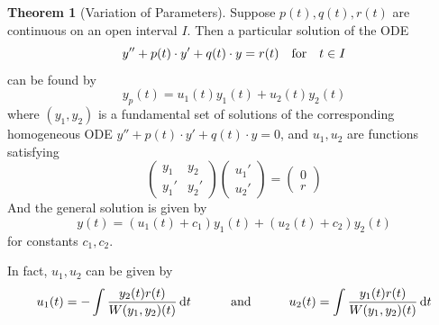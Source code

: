 \documentclass[10pt,UTF8]{article}
\newenvironment{theoremBox}
{
  \begin{tcolorbox}[colback=yellow!5!white,colframe=yellow!75!black,parbox=false,before
  upper=\par,before lower=\par]}
  {
\end{tcolorbox}}
\theoremstyle{definition}
\newtheorem{definition inner}{Definition}[section]
\theoremstyle{definition}
\newtheorem{theorem inner}{Theorem}[section]
\newenvironment{theorem}[1][]
{
  \begin{theoremBox}
  \begin{theorem inner}[#1]\hfill\par}
    {
    \end{theorem inner}
\end{theoremBox}}
\theoremstyle{definition}
\newtheorem*{proof inner}{\textit{Proof}}
\theoremstyle{plain}
\newtheorem{tip inner}{Tip}[section]
\theoremstyle{remark}
\begin{document}
\begin{theorem}[Variation of Parameters]
  {}\label{thm: Variation of Parameters}
  Suppose \(p(t), q(t), r(t)\) are continuous on an open interval \(I\).
  Then a particular solution of the ODE
  \begin{equation}
    y'' + p(t)\cdot y' + q(t)\cdot y = r(t)
    \qfor t \in I
    \label{eq: local.07 non-homogeneous CC ODE}
  \end{equation}
  can be found by
  \begin{equation}
    y_p(t) = u_1(t) y_1(t) + u_2(t) y_2(t)
    \label{eq: local.08 a particular solution}
  \end{equation}
  where \((y_1, y_2)\) is a fundamental set of solutions of the
  corresponding homogeneous ODE \(y'' + p(t)\cdot y' + q(t)\cdot y = 0\),
  and \(u_1, u_2\) are functions satisfying
  \begin{equation}
    \begin{pmatrix}
      y_1 & y_2 \\ y_1' & y_2'
    \end{pmatrix}
    \begin{pmatrix}
      u_1' \\ u_2'
    \end{pmatrix} =
    \begin{pmatrix}
      0 \\ r
    \end{pmatrix}
    \label{eq: local.09 conditions for u_1 and u_2}
  \end{equation}
  And the general solution is given by
  \begin{equation}
    y(t) = (u_1(t) + c_1) y_1(t) + (u_2(t) + c_2) y_2(t)
    \label{eq: local.11 the general solution}
  \end{equation}
  for constants \(c_1, c_2\).
\end{theorem}

In fact, \(u_1, u_2\) can be given by
\begin{equation}
  u_1(t) = - \int \frac{y_2(t) r(t)}{W(y_1,y_2)(t)} \dd{t}
  \qquad\qand\qquad
  u_2(t) = \int \frac{y_1(t) r(t)}{W(y_1,y_2)(t)} \dd{t}
  \label{eq: local.10 result of u_1 and u_2}
\end{equation}
\end{document}
